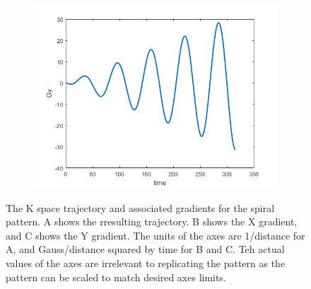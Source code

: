 \documentclass[12pt]{article}
\begin{document}
\begin{figure}[H]
\begin{subfigure}{0.3\textwidth}
	\includegraphics[width=\textwidth]{Figures/SpiralGy.png}
	\caption{}
	\label{Fig:spiralGy}
\end{subfigure}
\caption{The K space trajectory and associated gradients for the spiral pattern. A shows the rresulting trajectory. B shows the X gradient, and C shows the Y gradient. The units of the axes are 1/distance for A, and Gauss/distance squared by time for B and C. Teh actual values of the axes are irrelevant to replicating the pattern as the pattern can be scaled to match desired axes limits.}
\label{fig:spiral}
\end{figure}
\end{document}
